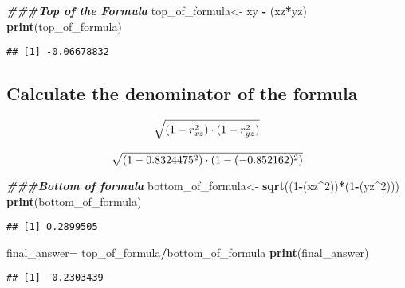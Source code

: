 \documentclass[
]{book}
\newenvironment{Shaded}{\begin{snugshade}}{\end{snugshade}}
\newcommand{\DecValTok}[1]{\textcolor[rgb]{0.00,0.00,0.81}{#1}}
\newcommand{\DocumentationTok}[1]{\textcolor[rgb]{0.56,0.35,0.01}{\textbf{\textit{#1}}}}
\newcommand{\FunctionTok}[1]{\textcolor[rgb]{0.13,0.29,0.53}{\textbf{#1}}}
\newcommand{\NormalTok}[1]{#1}
\newcommand{\OtherTok}[1]{\textcolor[rgb]{0.56,0.35,0.01}{#1}}
\newcommand{\SpecialCharTok}[1]{\textcolor[rgb]{0.81,0.36,0.00}{\textbf{#1}}}
\theoremstyle{definition}
\theoremstyle{definition}
\theoremstyle{definition}
\theoremstyle{definition}
\theoremstyle{remark}
\begin{document}
\begin{Shaded}
\begin{Highlighting}[]
\DocumentationTok{\#\#\#Top of the Formula}
\NormalTok{top\_of\_formula}\OtherTok{\textless{}{-}}\NormalTok{ xy }\SpecialCharTok{{-}}\NormalTok{ (xz}\SpecialCharTok{*}\NormalTok{yz)}
\FunctionTok{print}\NormalTok{(top\_of\_formula)}
\end{Highlighting}
\end{Shaded}

\begin{verbatim}
## [1] -0.06678832
\end{verbatim}

\hypertarget{calculate-the-denominator-of-the-formula}{%
\subsection{Calculate the denominator of the formula}\label{calculate-the-denominator-of-the-formula}}

\[\large
\sqrt{(1-r_{xz}^2) \cdot (1 - r_{yz}^2)}
\]

\[\large
\sqrt{(1-0.8324475^2) \cdot (1 - (-0.852162)^2)}
\]

\begin{Shaded}
\begin{Highlighting}[]
\DocumentationTok{\#\#\#Bottom of formula}
\NormalTok{bottom\_of\_formula}\OtherTok{\textless{}{-}} \FunctionTok{sqrt}\NormalTok{((}\DecValTok{1}\SpecialCharTok{{-}}\NormalTok{(xz}\SpecialCharTok{\^{}}\DecValTok{2}\NormalTok{))}\SpecialCharTok{*}\NormalTok{(}\DecValTok{1}\SpecialCharTok{{-}}\NormalTok{(yz}\SpecialCharTok{\^{}}\DecValTok{2}\NormalTok{)))}
\FunctionTok{print}\NormalTok{(bottom\_of\_formula)}
\end{Highlighting}
\end{Shaded}

\begin{verbatim}
## [1] 0.2899505
\end{verbatim}

\begin{Shaded}
\begin{Highlighting}[]
\NormalTok{final\_answer}\OtherTok{=}\NormalTok{ top\_of\_formula}\SpecialCharTok{/}\NormalTok{bottom\_of\_formula}
\FunctionTok{print}\NormalTok{(final\_answer)}
\end{Highlighting}
\end{Shaded}

\begin{verbatim}
## [1] -0.2303439
\end{verbatim}
\end{document}

